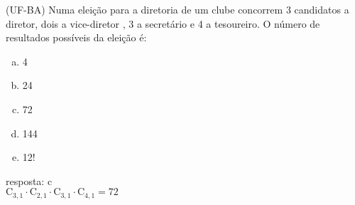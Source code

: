 \begin{ex}
 (UF-BA) Numa eleição para a diretoria de um clube concorrem 3 candidatos a diretor, dois a vice-diretor , 3 a secretário e 4 a tesoureiro. O número de resultados possíveis da eleição é:
    \begin{enumerate}[(a)]
    \item 4
    \item 24
    \item 72
    \item 144
    \item 12!
    \end{enumerate}
      \begin{sol}
        resposta: c  \\
        $\mathrm{C}_{3,1}\cdot\mathrm{C}_{2,1}\cdot\mathrm{C}_{3,1}\cdot\mathrm{C}_{4,1}=72$
      \end{sol}
      
\end{ex}